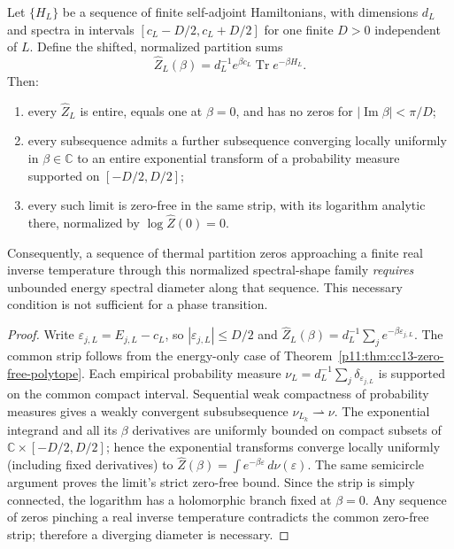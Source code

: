 \documentclass[12pt,a4paper]{article}
\begin{document}
\begin{corollary}
\label{p12:cor:cc13-zero-pinch}
Let $\{H_L\}$ be a sequence of finite self-adjoint Hamiltonians,
with dimensions $d_L$ and spectra in intervals
$[c_L-D/2,c_L+D/2]$ for one finite $D>0$ independent of $L$.
Define the shifted, normalized partition sums
\[
 \widehat Z_L(\beta)=d_L^{-1}e^{\beta c_L}
 \operatorname{Tr}e^{-\beta H_L}.
\]
Then:
\begin{enumerate}
\item every $\widehat Z_L$ is entire, equals one at $\beta=0$,
 and has no zeros for $|\operatorname{Im}\beta|<\pi/D$;
\item every subsequence admits a further subsequence converging
 locally uniformly in $\beta\in\mathbb C$ to an entire exponential
 transform of a probability measure supported on $[-D/2,D/2]$;
\item every such limit is zero-free in the same strip, with its
 logarithm analytic there, normalized by $\log \widehat Z(0)=0$.
\end{enumerate}
Consequently, a sequence of thermal partition zeros approaching a finite
real inverse temperature through this normalized spectral-shape family
\emph{requires} unbounded energy spectral diameter along that sequence.
This necessary condition is not sufficient for a phase transition.
\end{corollary}
\begin{proof}
Write $\varepsilon_{j,L}=E_{j,L}-c_L$, so
$|\varepsilon_{j,L}|\le D/2$ and
$\widehat Z_L(\beta)=d_L^{-1}\sum_j e^{-\beta\varepsilon_{j,L}}$.
The common strip follows from the energy-only case of
Theorem~\ref{p11:thm:cc13-zero-free-polytope}.  Each empirical
probability measure
$\nu_L=d_L^{-1}\sum_j\delta_{\varepsilon_{j,L}}$ is supported on
the common compact interval.  Sequential weak compactness of
probability measures gives a weakly convergent subsubsequence
$\nu_{L_k}\rightharpoonup\nu$.  The exponential integrand and all its
$\beta$ derivatives are uniformly bounded on compact subsets of
$\mathbb C\times[-D/2,D/2]$; hence the exponential transforms converge
locally uniformly (including fixed derivatives) to
$\widehat Z(\beta)=\int e^{-\beta\varepsilon}\,d\nu(\varepsilon)$.
The same semicircle argument proves the limit's strict zero-free
bound.  Since the strip is simply connected, the logarithm has a
holomorphic branch fixed at $\beta=0$.  Any sequence of zeros pinching
a real inverse temperature contradicts the common zero-free strip;
therefore a diverging diameter is necessary.
\end{proof}
\end{document}
